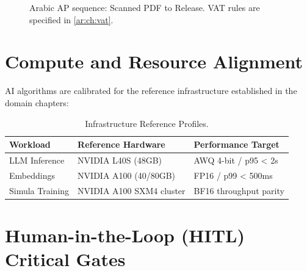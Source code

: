\documentclass[11pt,a4paper,twoside]{report}
\begin{document}
\begin{figure}[htbp]
\centering
{}
\caption{Arabic AP sequence: Scanned PDF to Release. VAT rules are specified in \cref{ar:ch:vat}.}
\end{figure}

\section{Compute and Resource Alignment}
\label{sec:hardware-profiles}

AI algorithms are calibrated for the reference infrastructure established in the domain chapters:

\begin{table}[htbp]
\centering
\footnotesize
\caption{Infrastructure Reference Profiles.}
\label{tab:hardware-profiles}
\begin{tabularx}{\textwidth}{@{}l X X@{}}
\toprule
\textbf{Workload} & \textbf{Reference Hardware} & \textbf{Performance Target} \\
\midrule
LLM Inference & NVIDIA L40S (48GB) & AWQ 4-bit / p95 < 2s \\
Embeddings & NVIDIA A100 (40/80GB) & FP16 / p99 < 500ms \\
Simula Training & NVIDIA A100 SXM4 cluster & BF16 throughput parity \\
\bottomrule
\end{tabularx}
\end{table}

\section{Human-in-the-Loop (HITL) Critical Gates}
\label{sec:hitl-gates}
\end{document}

